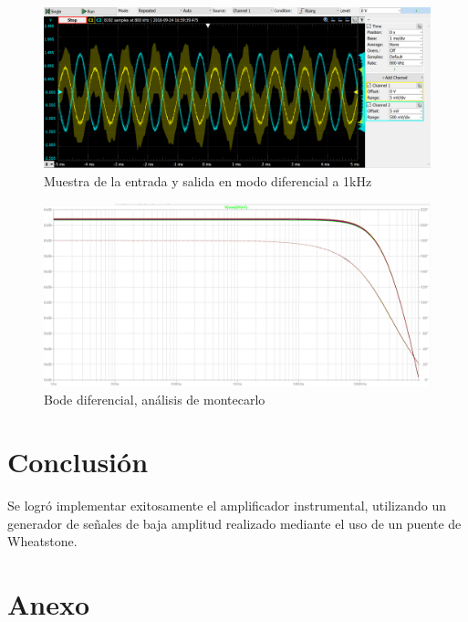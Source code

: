 \documentclass[../../tc_tp3_main.tex]{subfiles}
\begin{document}
		\begin{figure}[h!]	
		\centering
		\includegraphics[scale=0.6]{imagenes/ganancia_diferencial_medido.png}
		\caption{Muestra de la entrada y salida en modo diferencial a 1kHz}
		\label{fig:ej3_ganancia_diferencial_medido}
	\end{figure}

		\begin{figure}[h!]	
		\centering
		\includegraphics[scale=0.4]{imagenes/bode_diferencial_montecarlo.png}
		\caption{Bode diferencial, análisis de montecarlo}
		\label{fig:ej3_bode_diferencial_montecarlo}
	\end{figure}

\section{Conclusión}

Se logró implementar exitosamente el amplificador instrumental, utilizando un generador de señales de baja amplitud realizado mediante el uso de un puente de Wheatstone.


\clearpage\newpage

\section{Anexo}


\end{document}
